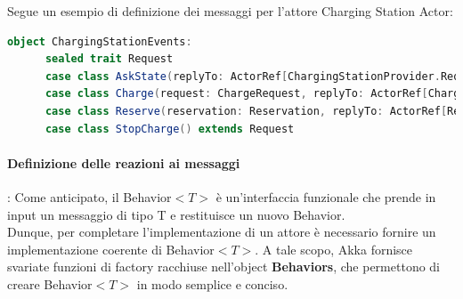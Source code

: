 Segue un esempio di definizione dei messaggi per l'attore Charging Station Actor:
\begin{lstlisting}[language=scala]
object ChargingStationEvents:
      sealed trait Request
      case class AskState(replyTo: ActorRef[ChargingStationProvider.Request]) extends Request
      case class Charge(request: ChargeRequest, replyTo: ActorRef[ChargeRequestResult]) extends Request
      case class Reserve(reservation: Reservation, replyTo: ActorRef[ReservationResult]) extends Request
      case class StopCharge() extends Request
\end{lstlisting}

\paragraph{Definizione delle reazioni ai messaggi}:
Come anticipato, il Behavior$<T>$ è un'interfaccia funzionale che prende in input un
messaggio di tipo T e restituisce un nuovo Behavior.\\

Dunque, per completare l'implementazione di un attore è necessario fornire un implementazione
coerente di Behavior$<T>$. A tale scopo, Akka fornisce svariate funzioni di factory racchiuse
nell'object \textbf{Behaviors}, che permettono di creare Behavior$<T>$ in modo semplice e conciso.\\

